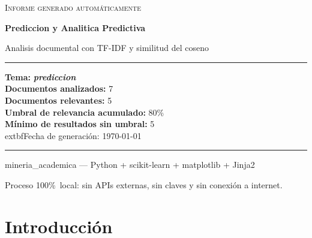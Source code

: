 \documentclass[11pt,a4paper]{article}
\newcommand{\tema}[1]{\textbf{\textit{#1}}}
\newcommand{\pcento}{\%}
\begin{document}
\begin{titlepage}
  \centering
  \vspace*{2.0cm}

  {\Large\textsc{Informe generado automáticamente}\par}
  \vspace{0.7cm}
  {\huge\bfseries Prediccion y Analitica Predictiva\par}
  \vspace{0.4cm}
  {\large Analisis documental con TF-IDF y similitud del coseno\par}

  \vspace{1.8cm}

  \begin{minipage}{0.92\textwidth}
    \hrule
    \vspace{0.4cm}
    {\small
    \textbf{Tema:} \tema{ prediccion }\\[4pt]
    \textbf{Documentos analizados:} 7\\
    \textbf{Documentos relevantes:} 5\\
    \textbf{Umbral de relevancia acumulado:} 80\pcento\\
    \textbf{Mínimo de resultados sin umbral:} 5\\
      	extbf{Fecha de generación:} \today
    \par}
    \vspace{0.4cm}
    \hrule
  \end{minipage}

  \vfill

  {\small mineria\_academica --- Python + scikit-learn + matplotlib + Jinja2\par}
  {\footnotesize
   Proceso 100\pcento\ local: sin APIs externas, sin claves y sin conexión
   a internet.\par}
\end{titlepage}

\tableofcontents
\newpage

\section{Introducción}
\label{sec:introduccion}
\end{document}
